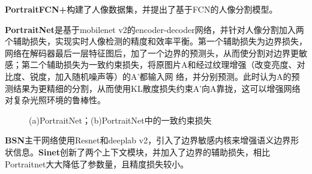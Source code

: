 \documentclass[11pt]{article}
\begin{document}
\textbf{PortraitFCN+}\cite{por+}构建了人像数据集，并提出了基于FCN的人像分割模型。

\textbf{PortraitNet}\cite{porn}是基于mobilenet v2的encoder-decoder网络，并针对人像分割加入两个辅助损失，实现实时人像检测的精度和效率平衡。第一个辅助损失为边界损失，网络在解码器最后一层特征图后，加了一个边界的预测头，从而使分割对边界更敏感；第二个辅助损失为一致约束损失，将原图片A和经过纹理增强（改变亮度、对比度、锐度，加入随机噪声等）的A'都输入网
络，并分别预测。此时认为A的预测结果为更精细的分割，从而使用KL散度损失约束A'向A靠拢，这可以增强网络对复杂光照环境的鲁棒性。
\begin{figure}[H]
    \centering
    \centering
    \caption{(a)PortraitNet\cite{porn}；(b)PortraitNet中的一致约束损失}
\end{figure}
\textbf{BSN}\cite{bou}主干网络使用Resnet和deeplab v2，引入了边界敏感内核来增强语义边界形状信息。\textbf{Sinet}\cite{ref43}创新了两个上下文模块，并加入了边界的辅助损失，相比Portraitnet大大降低了参数量，且精度损失较小。
\end{document}
